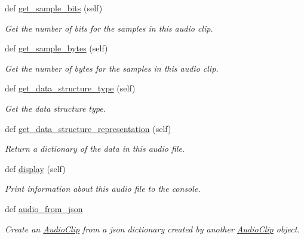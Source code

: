 \begin{DoxyCompactItemize}
def \hyperlink{classbridges_1_1audio__clip_1_1_audio_clip_a8dc41d20f5c06e83f7aea326072ef32e}{get\+\_\+sample\+\_\+bits} (self)
\begin{DoxyCompactList}\small\item\em Get the number of bits for the samples in this audio clip. \end{DoxyCompactList}\item 
def \hyperlink{classbridges_1_1audio__clip_1_1_audio_clip_a0e7b9cf8f6c59f5b402048e64925f204}{get\+\_\+sample\+\_\+bytes} (self)
\begin{DoxyCompactList}\small\item\em Get the number of bytes for the samples in this audio clip. \end{DoxyCompactList}\item 
def \hyperlink{classbridges_1_1audio__clip_1_1_audio_clip_a3fa69daf604ed0d7f22fa8f2c46cc0c4}{get\+\_\+data\+\_\+structure\+\_\+type} (self)
\begin{DoxyCompactList}\small\item\em Get the data structure type. \end{DoxyCompactList}\item 
def \hyperlink{classbridges_1_1audio__clip_1_1_audio_clip_a58dcd978d0a48dd338f850d7fea3d993}{get\+\_\+data\+\_\+structure\+\_\+representation} (self)
\begin{DoxyCompactList}\small\item\em Return a dictionary of the data in this audio file. \end{DoxyCompactList}\item 
def \hyperlink{classbridges_1_1audio__clip_1_1_audio_clip_aa6f7d21f1ab5296f8d0df267c12aea4a}{display} (self)
\begin{DoxyCompactList}\small\item\em Print information about this audio file to the console. \end{DoxyCompactList}\item 
def \hyperlink{classbridges_1_1audio__clip_1_1_audio_clip_a3c60325b9493a6db3f4a76362c4c4e54}{audio\+\_\+from\+\_\+json}
\begin{DoxyCompactList}\small\item\em Create an \hyperlink{classbridges_1_1audio__clip_1_1_audio_clip}{Audio\+Clip} from a json dictionary created by another \hyperlink{classbridges_1_1audio__clip_1_1_audio_clip}{Audio\+Clip} object. \end{DoxyCompactList}\end{DoxyCompactItemize}
